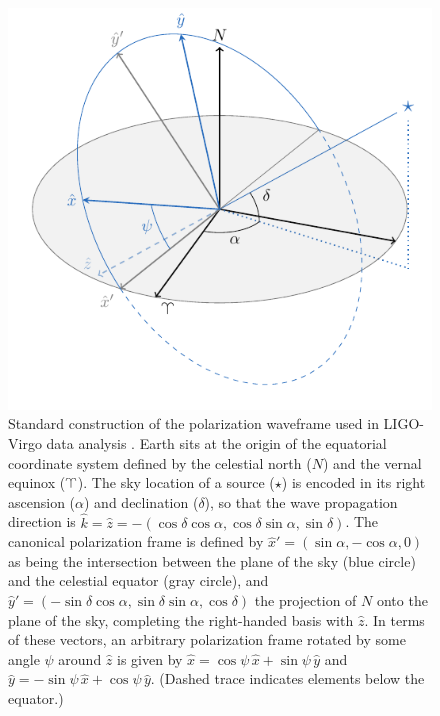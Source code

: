 \documentclass[aps,prd,twocolumn,superscriptaddress,preprintnumbers,floatfix,nofootinbib]{revtex4-2}
\begin{document}
\begin{figure}
\includegraphics[width=0.9\columnwidth]{diagram_waveframe.pdf}
\caption{Standard construction of the polarization waveframe used in LIGO-Virgo data analysis \cite{LALSuite:wave,Anderson:T010110}. Earth sits at the origin of the equatorial coordinate system defined by the celestial north ($N$) and the vernal equinox ($\vernal$). The sky location of a source ($\star$) is encoded in its right ascension ($\alpha$) and declination ($\delta$), so that the wave propagation direction is $\hat{k}=\hat{z}=-(\cos\delta \cos\alpha, \cos\delta\sin\alpha, \sin\delta)$. The canonical polarization frame is defined by $\hat{x}'=(\sin\alpha, -\cos\alpha,0)$ as being the intersection between the plane of the sky (blue circle) and the celestial equator (gray circle), and $\hat{y}'=(-\sin\delta \cos\alpha, \sin\delta\sin\alpha, \cos\delta)$ the projection of $N$ onto the plane of the sky, completing the right-handed basis with $\hat{z}$.
In terms of these vectors, an arbitrary polarization frame rotated by some angle $\psi$ around $\hat{z}$ is given by $\hat{x}=\cos\psi\,\hat{x} + \sin\psi\,\hat{y}$ and $\hat{y}=-\sin\psi\,\hat{x} + \cos\psi\,\hat{y}$. (Dashed trace indicates elements below the equator.)}
\label{fig:diagram_waveframe}
\end{figure}
\end{document}

